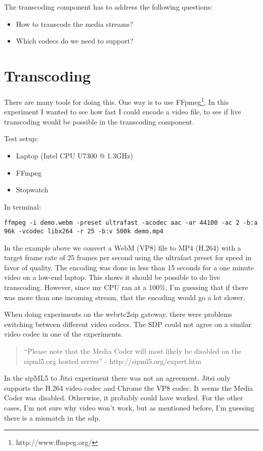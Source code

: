 The transcoding component has to address the following questions:

\begin{itemize}
\item{How to transcode the media streams?}
\item{Which codecs do we need to support?}
\end{itemize}

\section{Transcoding}
There are many tools for doing this. One way is to use FFpmeg\footnote{http://www.ffmpeg.org/}. In this experiment I wanted to see how fast I could encode a video file, to see if live transcoding would be possible in the transcoding component.

Test setup:
\begin{itemize}
\item Laptop (Intel CPU U7300 @ 1.3GHz)
\item FFmpeg
\item Stopwatch
\end{itemize}

In terminal:
\begin{lstlisting}
ffmpeg -i demo.webm -preset ultrafast -acodec aac -ar 44100 -ac 2 -b:a 96k -vcodec libx264 -r 25 -b:v 500k demo.mp4
\end{lstlisting}

In the example above we convert a WebM (VP8) file to MP4 (H.264) with a target frame rate of 25 frames per second using the ultrafast preset for speed in favor of quality. The encoding was done in less than 15 seconds for a one minute video on a low-end laptop. This shows it should be possible to do live transcoding. However, since my CPU ran at a 100\%, I'm guessing that if there was more than one incoming stream, that the encoding would go a lot slower.

When doing experiments on the webrtc2sip gateway, there were problems switching between different video codecs. The SDP could not agree on a similar video codec in one of the experiments.

\begin{quote}
``Please note that the Media Coder will most likely be disabled on the sipml5.org hosted server'' - http://sipml5.org/expert.htm
\end{quote}

In the sipML5 to Jitsi experiment there was not an agreement. Jitsi only supports the H.264 video codec and Chrome the VP8 codec. It seems the Media Coder was disabled. Otherwise, it probably could have worked. For the other cases, I'm not sure why video won't work, but as mentioned before, I'm guessing there is a mismatch in the \gls{sdp}.

